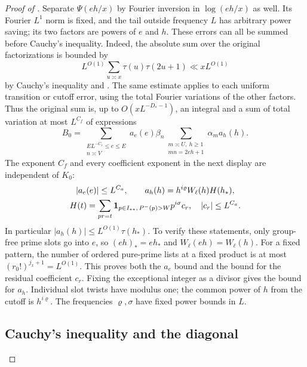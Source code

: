 \begin{proof}[Proof of ]
Separate $\Psi(eh/x)$ by Fourier inversion in $\log(eh/x)$ as well.
Its Fourier $L^1$ norm is fixed, and the tail outside frequency $L$
has arbitrary power saving; its two factors are powers of $e$ and $h$.
These errors can all be summed before Cauchy's inequality. Indeed, the
absolute sum over the original factorizations is bounded by
\begin{equation}\label{eq:typeii-absolute-pre-cauchy}
 L^{O(1)}\sum_{u\asymp x}\tau(u)\tau(2u+1)
                         \ll xL^{O(1)}
\end{equation}
by Cauchy's inequality and .
The same estimate applies to each uniform transition or cutoff error,
using the total Fourier variations of the other factors. Thus the
original sum is, up to $O(xL^{-D_*-1})$, an integral and a sum of total
variation at most $L^{C_{f}}$ of expressions
\begin{equation}\label{eq:typeii-separated-B}
 B_0=\sum_{\substack{EL^{-C_s}\leq e\leq E\\n\asymp V}}
 a_e(e)\beta_n
       \sum_{\substack{m\asymp U,\ h\geq1\\mn=2eh+1}}
                     \alpha_m a_h(h).
\end{equation}
The exponent $C_f$ and every coefficient exponent in the next
display are independent of $K_0$:
\begin{equation}\label{eq:typeii-separated-coefficients}
\begin{gathered}
 \lvert a_e(e)\rvert\leq L^{C_{a}},\qquad
 a_h(h)=h^{i\varrho}W_\ell(h)H(h_*),\\
 H(t)=\sum_{pr=t}
     \mathbf 1_{p\in I_{**},\,P^{-}(p)>W}p^{i\sigma}c_r,
 \quad \lvert c_r\rvert\leq L^{C_{a}}.
\end{gathered}
\end{equation}
In particular $|a_h(h)|\leq L^{O(1)}\tau(h_*)$.
To verify these statements, only group-free prime slots go into $e$,
so $(eh)_*=eh_*$ and $W_\ell(eh)=W_\ell(h)$. For a fixed pattern,
the number of ordered pure-prime lists at a fixed product is at most
$(r_0!)^{j_x+1}=L^{O(1)}$. This proves both the $a_e$ bound and the
bound for the residual coefficient $c_r$. Fixing the exceptional integer
as a divisor gives the bound for $a_h$. Individual slot twists have
modulus one; the common power of $h$ from the cutoff is $h^{i\varrho}$.
The frequencies $\varrho,\sigma$ have fixed power bounds in $L$.

\subsection{Cauchy's inequality and the diagonal}


\end{proof}
